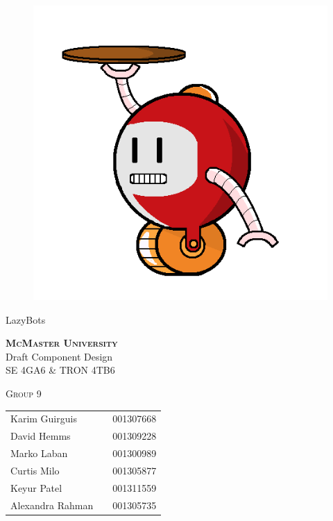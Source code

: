 \documentclass [10pt]{article}
\begin{document}
\begin {center} 

\thispagestyle{empty}
\vspace*{5cm}

\begin {figure}[h!]
\centering
\hspace{-10mm}\includegraphics [scale = .3, trim={.4cm 0 .8cm 0},clip] {figures/alfred.png}
\end {figure}

{\fontfamily{\cabinfamily}\selectfont
\Huge{LazyBots} }

\vspace{1 cm}
{\Large\textbf{\textsc{McMaster University}}\\}  \vspace {1cm}
{\Large Draft Component Design\\ \vspace {0.4 cm} SE 4GA6 \& TRON 4TB6}  \vspace {1cm}

{\large \textsc{Group 9} \\} \vspace{1cm}



\begin{tabular}{ l c  l}
Karim Guirguis & & 001307668 \\
David Hemms & & 001309228 \\
Marko Laban & & 001300989 \\
Curtis Milo & & 001305877 \\
Keyur Patel & & 001311559 \\
Alexandra Rahman & & 001305735
\end{tabular}


\end{center}
\end{document}
